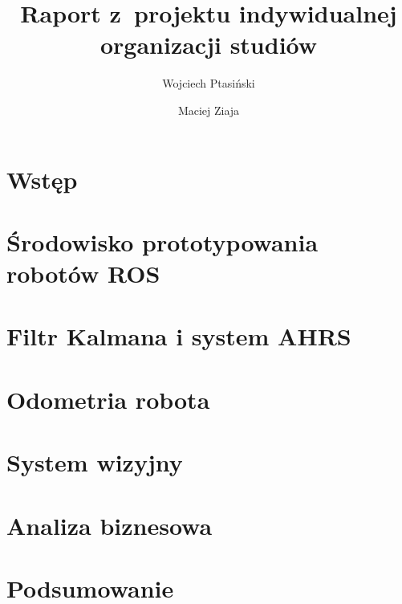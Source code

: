 \documentclass[a4paper]{report}
\author{Wojciech Ptasiński \and Maciej Ziaja}
\title{Raport z~projektu indywidualnej organizacji studiów}
\begin{document}
\maketitle

\tableofcontents

\chapter{Wstęp}


\chapter{Środowisko prototypowania robotów ROS}


\chapter{Filtr Kalmana i system AHRS}


\chapter{Odometria robota}


\chapter{System wizyjny}


\chapter{Analiza biznesowa}


\chapter{Podsumowanie}


\listoffigures
\end{document}

